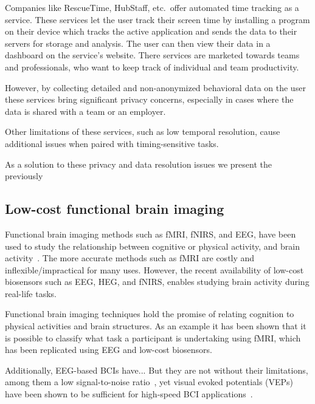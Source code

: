 \documentclass{IEEEtran}
\begin{document}
Companies like RescueTime, HubStaff, etc.\ offer automated time tracking as a service. These services let the user track their screen time by installing a program on their device which tracks the active application and sends the data to their servers for storage and analysis. The user can then view their data in a dashboard on the service's website. There services are marketed towards teams and professionals, who want to keep track of individual and team productivity.

However, by collecting detailed and non-anonymized behavioral data on the user these services bring significant privacy concerns, especially in cases where the data is shared with a team or an employer.

Other limitations of these services, such as low temporal resolution, cause additional issues when paired with timing-sensitive tasks.

As a solution to these privacy and data resolution issues we present the previously


\subsection{Low-cost functional brain imaging}

Functional brain imaging methods such as fMRI, fNIRS, and EEG, have been used to study the relationship between cognitive or physical activity, and brain activity~\cite{floyd_decoding_2017}\cite{hong_classification_2015}\cite{fucci_replication_2019}. The more accurate methods such as fMRI are costly and inflexible/impractical for many uses. However, the recent availability of low-cost biosensors such as EEG, HEG, and fNIRS, enables studying brain activity during real-life tasks.


Functional brain imaging techniques hold the promise of relating cognition to physical activities and brain structures. As an example it has been shown that it is possible to classify what task a participant is undertaking using fMRI\cite{floyd_decoding_2017}, which has been replicated using EEG and low-cost biosensors\cite{fucci_replication_2019}.

Additionally, EEG-based BCIs have... But they are not without their limitations, among them a low signal-to-noise ratio~\cite{mcfarland_eeg-based_2017}, yet visual evoked potentials (VEPs) have been shown to be sufficient for high-speed BCI applications~\cite{spuler_high-speed_2017}.
\end{document}

